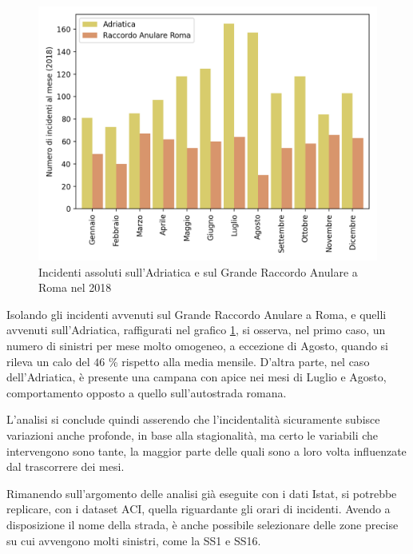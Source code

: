 \documentclass[a4paper]{report}
\begin{document}
\begin{figure}
    \hfill\includegraphics[width=0.7\linewidth]{../src/incidenti/incidenti_aci/autostrade/adriatica_roma.png}\hspace*{\fill}
    \caption{Incidenti assoluti sull'Adriatica e sul Grande Raccordo Anulare a Roma nel 2018}
    \label{fig:adriatica-roma}
\end{figure}

Isolando gli incidenti avvenuti sul Grande Raccordo Anulare a Roma, e quelli avvenuti 
sull'Adriatica, raffigurati nel grafico \ref{fig:adriatica-roma}, si osserva, 
nel primo caso, un numero di sinistri per mese molto omogeneo, a eccezione di 
Agosto, quando si rileva un calo del $46$ \% rispetto alla media mensile. 
D'altra parte, nel caso dell'Adriatica, è presente una campana con apice nei 
mesi di Luglio e Agosto, comportamento opposto a quello sull'autostrada 
romana. 

L'analisi si conclude quindi asserendo che l'incidentalità sicuramente subisce 
variazioni anche profonde, in base alla stagionalità, ma certo le variabili 
che intervengono sono tante, la maggior parte delle quali sono
a loro volta influenzate dal trascorrere dei mesi.

%


Rimanendo sull'argomento delle analisi già eseguite con i dati Istat, 
si potrebbe replicare, con i dataset ACI, quella riguardante gli orari di incidenti. 
Avendo a disposizione il nome della strada, è anche possibile selezionare delle zone precise 
su cui avvengono molti sinistri, come la SS1 e SS16. 
\end{document}
